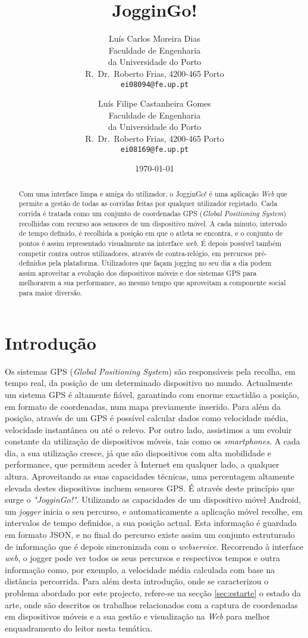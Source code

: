 \documentclass[twocolumn,twoside,10pt,a4paper]{article}
\title{JogginGo! }
\author{Luís Carlos Moreira Dias\\
\small Faculdade de Engenharia\\[-0.8ex]
\small da Universidade do Porto\\[-0.8ex]
\small R.\ Dr.\ Roberto Frias, 4200-465 Porto\\[-0.8ex]
\small \texttt{ei08094@fe.up.pt}\\
\and
Luís Filipe Castanheira Gomes\\
\small Faculdade de Engenharia\\[-0.8ex]
\small da Universidade do Porto\\[-0.8ex]
\small R.\ Dr.\ Roberto Frias, 4200-465 Porto\\[-0.8ex]
\small \texttt{ei08169@fe.up.pt}
}
\date{\today}
\begin{document}
\maketitle
\thispagestyle{plain} 

\begin{abstract}
Com uma interface limpa e amiga do utilizador, o JogginGo! é uma aplicação \textit{Web} que permite a gestão de todas as corridas feitas por qualquer utilizador registado. Cada corrida é tratada como um conjunto de coordenadas GPS (\textit{Global Positioning System}) recolhidas com recurso aos sensores de um dispositivo móvel. A cada minuto, intervalo de tempo definido, é recolhida a posição em que o atleta se encontra, e o conjunto de pontos é assim representado visualmente na interface \textit{web}. É depois possível também competir contra outros utilizadores, através de contra-relógio, em percursos pré-definidos pela plataforma. Utilizadores que façam jogging no seu dia a dia podem assim aproveitar a evolução dos dispositivos móveis e dos sistemas GPS para melhorarem a sua performance, ao mesmo tempo que aproveitam a componente social para maior diversão.
\end{abstract}

\section{Introdução}\label{sec:intro}

Os sistemas GPS (\emph{Global Positioning System}) são responsáveis pela recolha, em tempo real, da posição de um determinado dispositivo no mundo. Actualmente um sistema GPS é altamente fiável, garantindo com enorme exactidão a posição, em formato de coordenadas, num mapa previamente inserido. Para além da posição, através de um GPS é possível calcular dados como velocidade média, velocidade instantânea ou até o relevo.
Por outro lado, assistimos a um evoluir constante da utilização de dispositivos móveis, tais como os \emph{smartphones}. A cada dia, a sua utilização cresce, já que são dispositivos com alta mobilidade e performance, que permitem aceder à Internet em qualquer lado, a qualquer altura. Aproveitando as suas capacidades técnicas, uma percentagem altamente elevada destes dispositivos incluem sensores GPS. 
É através deste princípio que surge o \textit{"JogginGo!"}. Utilizando as capacidades de um dispositivo móvel Android, um \emph{jogger} inicia o seu percurso, e automaticamente a aplicação móvel recolhe, em intervalos de tempo definidos, a sua posição actual. Esta informação é guardada em formato JSON, e no final do percurso existe assim um conjunto estruturado de informação que é depois sincronizada com o \emph{webservice}. Recorrendo à interface \textit{web}, o jogger pode ver todos os seus percursos e respectivos tempos e outra informação como, por exemplo, a velocidade média calculada com base na distância percorrida.
Para além desta introdução, onde se caracterizou o problema abordado
por este projecto, refere-se na secção \ref{sec:estarte} o
estado da arte, onde são descritos os trabalhos relacionados com a
captura de coordenadas em dispositivos móveis e a sua gestão e visualização na \textit{Web} para melhor enquadramento do leitor nesta temática. 
\end{document}
